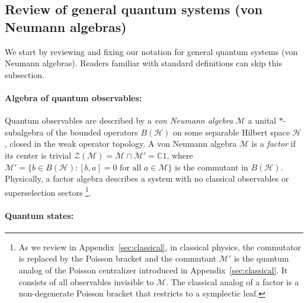 \documentclass[a4paper,11pt]{article}
\theoremstyle{definition}
\newcommand{\mH}{\mathcal{H}}
\newcommand{\mM}{\mathcal{M}}
\begin{document}
\subsection{Review of general quantum systems (von Neumann algebras)}\label{app:vN}


We start by reviewing and fixing our notation for general quantum systems (von Neumann algebras). Readers familiar with standard definitions can skip this subsection.

\paragraph{Algebra of quantum observables:}
Quantum observables are described by a
\emph{von Neumann algebra} $\mM$ a unital $*$-subalgebra of the bounded operators
$B(\mathcal{H})$ on some separable Hilbert space $\mathcal{H}$, closed in the
weak operator topology.
A von Neumann algebra $\mM$ is a \emph{factor} if its center is trivial
$\mathcal{Z}(\mM) = \mM\cap\mM'=\mathbb{C} 1$, where $\mM' = \{b\in B(\mathcal{H}) : [b,a]=0\text{ for all }a\in\mM\}$
is the commutant in $B(\mH)$.  Physically, a factor algebra describes a system with no classical observables
 or superselection sectors \footnote{As we review in Appendix~\ref{sec:classical}, in classical physics, the commutator is replaced by the Poisson bracket and the commutant $\mM'$ is the quantum analog of the Poisson
centralizer introduced in Appendix~\ref{sec:classical}. It consists of all observables invisible to $\mM$. The classical analog of a factor is a non-degenerate Poisson bracket that restricts to a symplectic leaf.}.

\paragraph{Quantum states:}
\end{document}
